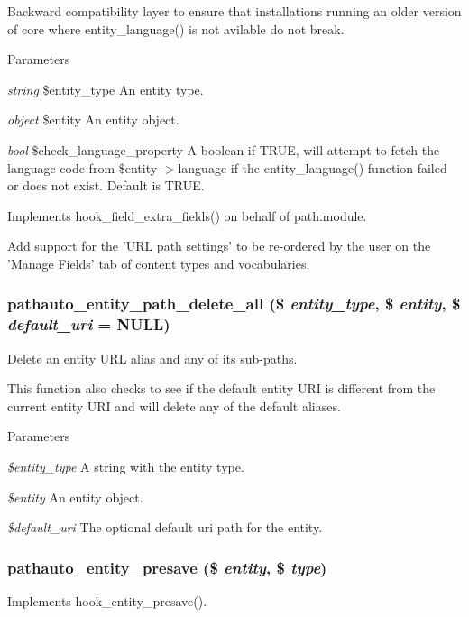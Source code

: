 Backward compatibility layer to ensure that installations running an older version of core where entity\_\-language() is not avilable do not break.


\begin{DoxyParams}{Parameters}
\item[{\em string}]\$entity\_\-type An entity type. \item[{\em object}]\$entity An entity object. \item[{\em bool}]\$check\_\-language\_\-property A boolean if TRUE, will attempt to fetch the language code from \$entity-\/$>$language if the entity\_\-language() function failed or does not exist. Default is TRUE. \end{DoxyParams}


Implements hook\_\-field\_\-extra\_\-fields() on behalf of path.module.

Add support for the 'URL path settings' to be re-\/ordered by the user on the 'Manage Fields' tab of content types and vocabularies.\hypertarget{pathauto_8module_a3bc05a506e9cefc24923f10ae3069c79}{
\subsubsection[{pathauto\_\-entity\_\-path\_\-delete\_\-all}]{\setlength{\rightskip}{0pt plus 5cm}pathauto\_\-entity\_\-path\_\-delete\_\-all (\$ {\em entity\_\-type}, \/  \$ {\em entity}, \/  \$ {\em default\_\-uri} = {\ttfamily NULL})}}
\label{pathauto_8module_a3bc05a506e9cefc24923f10ae3069c79}
Delete an entity URL alias and any of its sub-\/paths.

This function also checks to see if the default entity URI is different from the current entity URI and will delete any of the default aliases.


\begin{DoxyParams}{Parameters}
\item[{\em \$entity\_\-type}]A string with the entity type. \item[{\em \$entity}]An entity object. \item[{\em \$default\_\-uri}]The optional default uri path for the entity. \end{DoxyParams}
\hypertarget{pathauto_8module_ae713b574335b0b8a1069a37d63c5c365}{
\subsubsection[{pathauto\_\-entity\_\-presave}]{\setlength{\rightskip}{0pt plus 5cm}pathauto\_\-entity\_\-presave (\$ {\em entity}, \/  \$ {\em type})}}
\label{pathauto_8module_ae713b574335b0b8a1069a37d63c5c365}
Implements hook\_\-entity\_\-presave(). 

